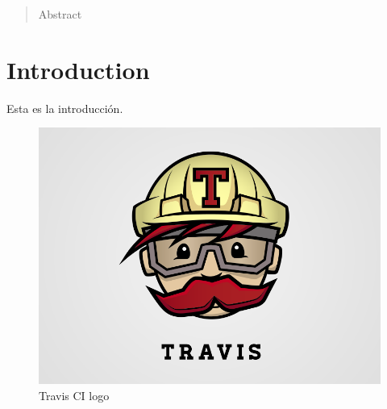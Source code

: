\documentclass[a4paper,12pt]{article}
\author{Soler, Santiago \\{\small santiago.r.soler@gmail.com }}
\date{}
\begin{document}
\maketitle

\begin{abstract}
Abstract
\end{abstract}


\section{Introduction}

Esta es la introducción.

\begin{figure}[h]
\centering
\includegraphics[width=\textwidth]{figs/travis.png}
\caption{Travis CI logo}
\end{figure}
\end{document}
